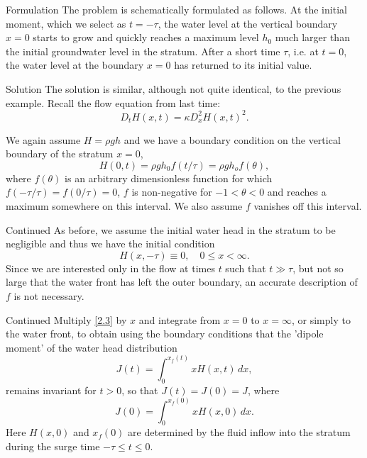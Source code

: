 \documentclass[10pt]{beamer}
\begin{document}
\begin{frame}{Formulation}
  The problem is schematically formulated as follows.
  At the initial moment, which we select as $t = -\tau$, the water level at the vertical boundary $x=0$ starts to grow and quickly reaches a maximum level $h_0$ much larger than the initial groundwater level in the stratum.
  After a short time $\tau$, i.e. at $t=0$, the water level at the boundary $x=0$ has returned to its initial value.
\end{frame}

\begin{frame}{Solution}
  The solution is similar, although not quite identical, to the previous example.
  Recall the flow equation from last time: 
  \begin{equation}
    \label{2.3}
    D_tH(x,t) = \kappa D_x^2H(x,t)^2.
  \end{equation}
  
  We again assume $H = \rho g h$ and we have a boundary condition on the vertical boundary of the stratum $x=0$, 
  $$H(0,t)=\rho g h_0f(t/\tau) = \rho g h_of(\theta),$$
  where $f(\theta)$ is an arbitrary dimensionless function for which $f(-\tau/\tau) = f(0/\tau) = 0$, $f$ is non-negative for $-1 < \theta < 0$ and reaches a maximum somewhere on this interval.
  We also assume $f$ vanishes off this interval.
\end{frame}

\begin{frame}{Continued}
  As before, we assume the initial water head in the stratum to be negligible and thus we have the initial condition $$H(x,-\tau) \equiv 0, \quad 0 \leq x < \infty.$$
  Since we are interested only in the flow at times $t$ such that $t \gg \tau$, but not so large that the water front has left the outer boundary, an accurate description of $f$ is not necessary.
\end{frame}

\begin{frame}{Continued}
  Multiply \eqref{2.3} by $x$ and integrate from $x = 0$ to $x = \infty$, or simply to the water front, to obtain using the boundary conditions that the 'dipole moment' of the water head distribution
  $$J(t) = \int_0^{x_f(t)} xH(x,t)\,dx,$$
  remains invariant for $t > 0$, so that $J(t) = J(0) = J$, where 
  $$J(0) = \int_0^{x_f(0)} xH(x,0)\,dx.$$
  Here $H(x,0)$ and $x_f(0)$ are determined by the fluid inflow into the stratum during the surge time $-\tau \leq t \leq 0$.
\end{frame}
\end{document}
